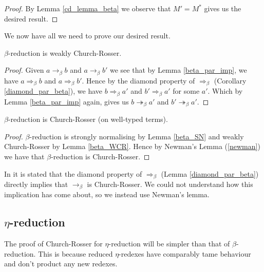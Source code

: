 \begin{proof}
    By Lemma \ref{cd_lemma_beta} we observe that $M' = M^*$ gives us the desired result.
\end{proof}

We now have all we need to prove our desired result.

\begin{lemma}\label{beta_WCR}
    $\beta$-reduction is weakly Church-Rosser.
\end{lemma}

\begin{proof}
    Given $a \to_\beta b$ and $a \to_\beta b'$ we see that by Lemma \ref{beta_par_imp}, we have $a \Rightarrow_\beta b$ and $a \Rightarrow_\beta b'$. Hence by the diamond property of $\Rightarrow_\beta$ (Corollary \ref{diamond_par_beta}), we have $b \Rightarrow_\beta a'$ and $b' \Rightarrow_\beta a'$ for some $a'$. Which by Lemma \ref{beta_par_imp} again, gives us $b \twoheadrightarrow_\beta a'$ and $b' \twoheadrightarrow_\beta a'$.
\end{proof}

\begin{theorem}
    $\beta$-reduction is Church-Rosser (on well-typed terms).
\end{theorem}

\begin{proof}
    $\beta$-reduction is strongly normalising by Lemma \ref{beta_SN} and weakly Church-Rosser by Lemma \ref{beta_WCR}. Hence by Newman's Lemma (\ref{newman}) we have that $\beta$-reduction is Church-Rosser. 
\end{proof}

\begin{remark}
    In \cite{Takahashi:1995:PR9:207177.207191, barendregt1984lambda} it is stated that the diamond property of $\Rightarrow_\beta$ (Lemma \ref{diamond_par_beta}) directly implies that $\to_\beta$ is Church-Rosser. We could not understand how this implication has come about, so we instead use Newman's lemma.
\end{remark}



\subsection{$\eta$-reduction}

The proof of Church-Rosser for $\eta$-reduction will be simpler than that of $\beta$-reduction. This is because reduced $\eta$-redexes have comparably tame behaviour and don't product any new redexes.

